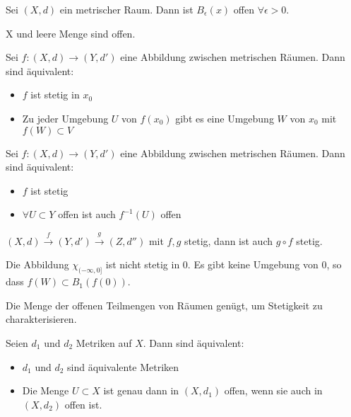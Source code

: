 \begin{lem}
    Sei $(X, d)$ ein metrischer Raum. Dann ist $B_\epsilon(x)$ offen
    $\forall \epsilon > 0$.
\end{lem}

\begin{lem}
    X und leere Menge sind offen.
\end{lem}

\begin{stz}
    Sei $f: (X, d) \to (Y, d')$ eine Abbildung zwischen metrischen Räumen. Dann sind
    äquivalent:
   \begin{itemize}
        \item $f$ ist stetig in $x_0$
        \item Zu jeder Umgebung $U$ von $f(x_0)$ gibt es eine Umgebung $W$ von $x_0$
              mit $f(W)\subset V$
    \end{itemize}
\end{stz}

\begin{stz}
    Sei $f: (X, d) \to (Y, d')$ eine Abbildung zwischen metrischen Räumen. Dann sind
    äquivalent:
    \begin{itemize}
        \item $f$ ist stetig
        \item $\forall U \subset Y$ offen ist auch $f^{-1}(U)$ offen
    \end{itemize}
\end{stz}

\begin{krl}
    $(X,d) \overset{f}{\to} (Y,d') \overset{g}{\to} (Z, d'')$ mit $f,g$ stetig, dann
    ist auch $g \circ f$ stetig.
\end{krl}

\begin{bsp}
    Die Abbildung $\chi_{(-\infty,0]}$ ist nicht stetig in 0. Es gibt keine Umgebung
    von 0, so dass $f(W) \subset B_1(f(0))$.
\end{bsp}

\begin{bem}
    Die Menge der offenen Teilmengen von Räumen genügt, um Stetigkeit zu
    charakterisieren.
\end{bem}

\begin{stz}
    Seien $d_1$ und $d_2$ Metriken auf $X$. Dann sind äquivalent:
    \begin{itemize}
        \item $d_1$ und $d_2$ sind äquivalente Metriken
        \item Die Menge $U \subset X$ ist genau dann in $(X, d_1)$ offen, wenn sie
              auch in $(X, d_2)$ offen ist.
    \end{itemize}
\end{stz}

